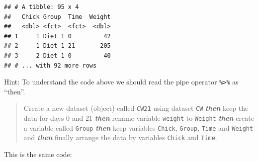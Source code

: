 \documentclass[]{book}
\newenvironment{Shaded}{\begin{snugshade}}{\end{snugshade}}
\newcommand{\DataTypeTok}[1]{\textcolor[rgb]{0.13,0.29,0.53}{#1}}
\newcommand{\DecValTok}[1]{\textcolor[rgb]{0.00,0.00,0.81}{#1}}
\newcommand{\KeywordTok}[1]{\textcolor[rgb]{0.13,0.29,0.53}{\textbf{#1}}}
\newcommand{\NormalTok}[1]{#1}
\newcommand{\OperatorTok}[1]{\textcolor[rgb]{0.81,0.36,0.00}{\textbf{#1}}}
\newcommand{\StringTok}[1]{\textcolor[rgb]{0.31,0.60,0.02}{#1}}
\theoremstyle{definition}
\theoremstyle{definition}
\theoremstyle{definition}
\theoremstyle{remark}
\begin{document}
\begin{Shaded}
\end{Shaded}

\begin{verbatim}
## # A tibble: 95 x 4
##   Chick Group  Time  Weight
##   <dbl> <fct>  <fct>  <dbl>
## 1     1 Diet 1 0         42
## 2     1 Diet 1 21       205
## 3     2 Diet 1 0         40
## # ... with 92 more rows
\end{verbatim}

Hint: To understand the code above we should read the pipe operator \texttt{\%\textgreater{}\%} as ``then''.

\begin{quote}
Create a new dataset (object) called \texttt{CW21} using dataset \texttt{CW} \textbf{\emph{then}}
keep the data for days 0 and 21 \textbf{\emph{then}} rename variable \texttt{weight} to \texttt{Weight}
\textbf{\emph{then}} create a variable called \texttt{Group} \textbf{\emph{then}} keep variables \texttt{Chick},
\texttt{Group}, \texttt{Time} and \texttt{Weight} and \textbf{\emph{then}} finally arrange the data by
variables \texttt{Chick} and \texttt{Time}.
\end{quote}

This is the same code:

\begin{Shaded}
\end{Shaded}
\end{document}
